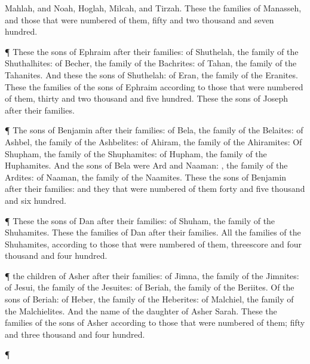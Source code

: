 {{}
Mahlah, and
Noah,
Hoglah,
Milcah, and
Tirzah.
These
{} the
families of
Manasseh, and those that were
numbered of them,
fifty and
two
thousand and
seven
hundred.
\par }{\PP {}¶ These
{} the
sons of
Ephraim after their
families: of
Shuthelah, the
family of the
Shuthalhites: of
Becher, the
family of the
Bachrites: of
Tahan, the
family of the
Tahanites.
And these
{} the
sons of
Shuthelah: of
Eran, the
family of the
Eranites.
These
{} the
families of the
sons of
Ephraim according to those that were
numbered of them,
thirty and
two
thousand and
five
hundred. These
{} the
sons of
Joseph after their
families.
\par }{\PP {}¶ The
sons of
Benjamin after their
families: of
Bela, the
family of the
Belaites: of
Ashbel, the
family of the
Ashbelites: of
Ahiram, the
family of the
Ahiramites:
Of
Shupham, the
family of the
Shuphamites: of
Hupham, the
family of the
Huphamites.
And the
sons of
Bela were
Ard and
Naaman:
{}, the
family of the
Ardites:
{} of
Naaman, the
family of the
Naamites.
These
{} the
sons of
Benjamin after their
families: and they that were
numbered of them
{}
forty and
five
thousand and
six
hundred.
\par }{\PP {}¶ These
{} the
sons of
Dan after their
families: of
Shuham, the
family of the
Shuhamites. These
{} the
families of
Dan after their
families.
All the
families of the
Shuhamites, according to those that were
numbered of them,
{}
threescore and
four
thousand and
four
hundred.
\par }{\PP {}¶
{} the
children of
Asher after their
families: of
Jimna, the
family of the
Jimnites: of
Jesui, the
family of the
Jesuites: of
Beriah, the
family of the
Beriites.
Of the
sons of
Beriah: of
Heber, the
family of the
Heberites: of
Malchiel, the
family of the
Malchielites.
And the
name of the
daughter of
Asher
{}
Sarah.
These
{} the
families of the
sons of
Asher according to those that were
numbered of them;
{}
fifty and
three
thousand and
four
hundred.
\par }{\PP {}¶
}
